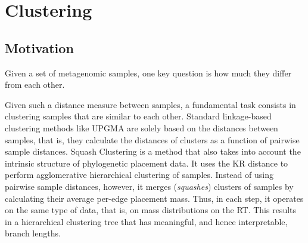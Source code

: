 
\chapter{Clustering}
\label{ch:Clustering}




\section{Motivation}
\label{ch:Clustering:sec:Motivation}

Given a set of metagenomic samples, one key question is how much they differ from each other.
 

Given such a distance measure between samples,
a fundamental task consists in clustering samples that are similar to each other.
Standard linkage-based clustering methods like \mbox{UPGMA} %
\cite{Michener1957,Sokal1958,Legendre1998} are solely based on the distances between samples,
that is, they calculate the distances of clusters as a function of pairwise sample distances.
Squash Clustering \cite{Matsen2011a,Srinivasan2012} is a method that
also takes into account the intrinsic structure of phylogenetic placement data.
It uses the KR distance to perform agglomerative hierarchical clustering of samples.
Instead of using pairwise sample distances, however,
it merges (\emph{squashes}) clusters of samples by calculating their average per-edge placement mass.
Thus, in each step, it operates on the same type of data, that is, on mass distributions on the \ac{RT}.
This results in a hierarchical clustering tree that has meaningful, and hence interpretable, branch lengths.

